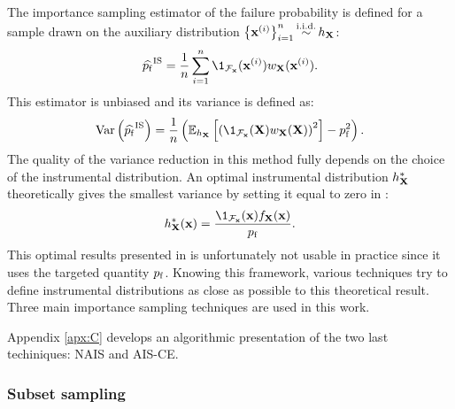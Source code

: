 The importance sampling estimator of the failure probability is defined for a sample drawn on the auxiliary distribution $\left\{{\bf x}^{(i)}\right\}_{i=1}^n \mathop{\sim}\limits^{\mathrm{i.i.d.}} h_{\bf X}$: 
\begin{equation}
    \what{\pf}^{\mathrm{IS}} = \frac1n \sum_{i=1}^{n} \1_{\iF_\bx}(\bx^{(i)}) w_\bX(\bx^{(i)}).
\end{equation}
This estimator is unbiased and its variance is defined as: 
\begin{equation}
    \var\left( \what{\pf}^{\mathrm{IS}}\right) = \frac1n \left( \E_{h_\bX}\left[\left(\1_{\iF_\bx}(\bX) w_\bX(\bX)\right)^2\right] - \pf^2\right).
\end{equation}
The quality of the variance reduction in this method fully depends on the choice of the instrumental distribution. 
An optimal instrumental distribution $h_{{\bf X}}^*$ theoretically gives the smallest variance by setting it equal to zero in : 
\begin{equation}
    h_{\bX}^*(\bx) = \frac{\1_{\iF_\bx}(\bx) f_\bX(\bx)}{\pf}. 
\end{equation}
This optimal results presented in  is unfortunately not usable in practice since it uses the targeted quantity $p_\mathrm{f}$. 
Knowing this framework, various techniques try to define instrumental distributions as close as possible to this theoretical result. 
Three main importance sampling techniques are used in this work. 



 
Appendix \ref{apx:C} develops an algorithmic presentation of the two last techiniques: NAIS and AIS-CE.


\subsubsection{Subset sampling}

